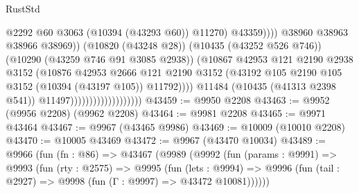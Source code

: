 \begin{lexlean}{RustStd}
\begin{coremodule}
                                                          @2292
                                                          @60
                                                          @3063
                                                          (@10394 (@43293 @60))
                                                          @11270)
                                                        @43359))))
                                                @38960
                                                @38963
                                                @38966
                                                @38969))
                                            (@10820 (@43248 @28))
                                            (@10435 (@43252 @526 @746))
                                            (@10290 (@43259 @746 @91 @3085 @2938))
                                            (@10867
                                              @42953
                                              @121
                                              @2190
                                              @2938
                                              @3152
                                              (@10876
                                                @42953
                                                @2666
                                                @121
                                                @2190
                                                @3152
                                                (@43192
                                                  @105
                                                  @2190
                                                  @105
                                                  @3152
                                                  (@10394 (@43197 @105))
                                                  @11792))))
                                          @11484
                                          (@10435 (@41313 @2398 @541))
                                          @11497)))))))))))))))))))
@43459 := @9950 @2208
@43463 := @9952 (@9956 @2208) (@9962 @2208)
@43464 := @9981 @2208
@43465 := @9971 @43464
@43467 := @9967 (@43465 @9986)
@43469 := @10009 (@10010 @2208)
@43470 := @10005 @43469
@43472 := @9967 (@43470 @10034)
@43489 := @9966
    (fun (fn : @86) =>
    @43467
      (@9989
        (@9992
          (fun (params : @9991) =>
          @9993
            (fun (rty : @2575) =>
            @9995
              (fun (lets : @9994) =>
              @9996 (fun (tail : @2927) => @9998 (fun (Γ : @9997) => @43472 @10081))))))

\end{coremodule}
\end{lexlean}
